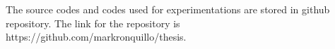 
\begin{footnotesize}

The source codes and codes used for experimentations are stored in github repository. The link for the repository is https://github.com/markronquillo/thesis.

\end{footnotesize}